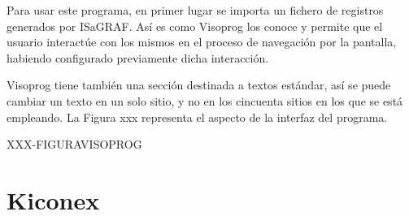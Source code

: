 Para usar este programa, en primer lugar se importa un fichero de registros generados por ISaGRAF. Así es como Visoprog los conoce y permite que el usuario interactúe con los mismos en el proceso de navegación por la pantalla, habiendo configurado previamente dicha interacción.

Visoprog tiene también una sección destinada a textos estándar, así se puede cambiar un texto en un solo sitio, y no en los cincuenta sitios en los que se está empleando. La Figura xxx representa el aspecto de la interfaz del programa.

XXX-FIGURAVISOPROG

\section{Kiconex}
\label{sec:kiconex}

